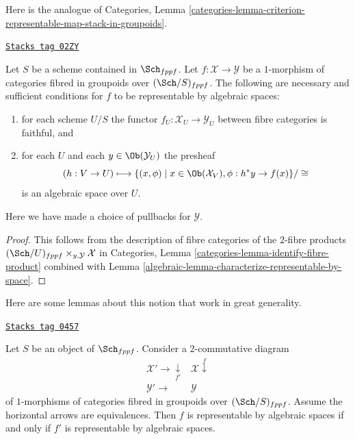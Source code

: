 \medskip\noindent
Here is the analogue of Categories,
Lemma \ref{categories-lemma-criterion-representable-map-stack-in-groupoids}.

\begin{lemma}
\label{algebraic-lemma-criterion-map-representable-spaces-fibred-in-groupoids}
\href{https://stacks.math.columbia.edu/tag/02ZY}{\texttt{Stacks tag 02ZY}}

Let $S$ be a scheme contained in $\Sch_{fppf}$.
Let $f : \mathcal{X} \to \mathcal{Y}$ be a $1$-morphism
of categories fibred in groupoids over $(\Sch/S)_{fppf}$.
The following are necessary and sufficient conditions for
$f$ to be representable by algebraic spaces:
\begin{enumerate}
\item for each scheme $U/S$ the
functor $f_U : \mathcal{X}_U \longrightarrow \mathcal{Y}_U$
between fibre categories is faithful, and
\item for each $U$ and each $y \in \Ob(\mathcal{Y}_U)$ the presheaf
$$
(h : V \to U)
\longmapsto
\{(x, \phi) \mid x \in \Ob(\mathcal{X}_V), \phi : h^*y \to f(x)\}/\cong
$$
is an algebraic space over $U$.
\end{enumerate}
Here we have made a choice of pullbacks for $\mathcal{Y}$.
\end{lemma}

\begin{proof}

This follows from the description of fibre categories of the $2$-fibre products
$(\Sch/U)_{fppf} \times_{y, \mathcal{Y}} \mathcal{X}$ in
Categories, Lemma \ref{categories-lemma-identify-fibre-product}
combined with
Lemma \ref{algebraic-lemma-characterize-representable-by-space}.
\end{proof}

Here are some lemmas about this notion that work in great generality.

\begin{lemma}
\label{algebraic-lemma-representable-by-spaces-morphism-equivalent}
\href{https://stacks.math.columbia.edu/tag/0457}{\texttt{Stacks tag 0457}}

Let $S$ be an object of $\Sch_{fppf}$.
Consider a $2$-commutative diagram
$$
\begin{array}{cc}\mathcal{X}' \longrightarrow\underset{f'}{\downarrow} & \mathcal{X} \overset{f}{\downarrow} \\ \mathcal{Y}' \longrightarrow & \mathcal{Y}\end{array}
$$
of $1$-morphisms of categories fibred in groupoids over
$(\Sch/S)_{fppf}$.
Assume the horizontal arrows are equivalences.
Then $f$ is representable by algebraic spaces
if and only if $f'$ is representable by algebraic spaces.
\end{lemma}

